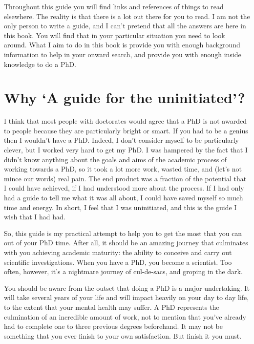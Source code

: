 \documentclass[
]{krantz}
\begin{document}
Throughout this guide you will find links and references of things to read elsewhere. The reality is that there is a lot out there for you to read. I am not the only person to write a guide, and I can't pretend that all the answers are here in this book. You will find that in your particular situation you need to look around. What I aim to do in this book is provide you with enough background information to help in your onward search, and provide you with enough inside knowledge to do a PhD.

\hypertarget{why-a-guide-for-the-uninitiated}{%
\section*{Why `A guide for the uninitiated'?}\label{why-a-guide-for-the-uninitiated}}


I think that most people with doctorates would agree that a PhD is not awarded to people because they are particularly bright or smart. If you had to be a genius then I wouldn't have a PhD. Indeed, I don't consider myself to be particularly clever, but I worked very hard to get my PhD. I was hampered by the fact that I didn't know anything about the goals and aims of the academic process of working towards a PhD, so it took a lot more work, wasted time, and (let's not mince our words) real pain. The end product was a fraction of the potential that I could have achieved, if I had understood more about the process. If I had only had a guide to tell me what it was all about, I could have saved myself so much time and energy. In short, I feel that I was uninitiated, and this is the guide I wish that I had had.

So, this guide is my practical attempt to help you to get the most that you can out of your PhD time. After all, it should be an amazing journey that culminates with you achieving academic maturity: the ability to conceive and carry out scientific investigations. When you have a PhD, you become a scientist. Too often, however, it's a nightmare journey of cul-de-sacs, and groping in the dark.

You should be aware from the outset that doing a PhD is a major undertaking. It will take several years of your life and will impact heavily on your day to day life, to the extent that your mental health may suffer. A PhD represents the culmination of an incredible amount of work, not to mention that you've already had to complete one to three previous degrees beforehand. It may not be something that you ever finish to your own satisfaction. But finish it you must.
\end{document}
